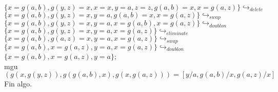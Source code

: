 \documentclass{article}
\begin{document}
$\{x=g(a,b), g(y,z)=x, x=x, y=a, z=z, g(a,b)=x, x=g(a,z)\} \hookrightarrow_{delete}$\\

$\{x=g(a,b), g(y,z)=x, y=a, g(a,b)=x, x=g(a,z)\} \hookrightarrow_{swap}$\\

$\{x=g(a,b), g(y,z)=x, y=a, x=g(a,b), x=g(a,z)\} \hookrightarrow_{doublon}$\\

$\{x=g(a,b), g(y,z)=x, y=a, x=g(a,z)\} \hookrightarrow_{eliminate}$\\

$\{x=g(a,b), g(a,z)=x, y=a, x=g(a,z)\} \hookrightarrow_{swap}$\\

$\{x=g(a,b), x=g(a,z), y=a, x=g(a,z)\} \hookrightarrow_{doublon}$\\

$\{x=g(a,b), x=g(a,z), y=a\}$;\\

mgu$(g(x,g(y,z)), g(g(a,b),x), g(x,g(a,z))) = [y/a, g(a,b)/x, g(a,z)/x]$\\
Fin algo.
\end{document}
